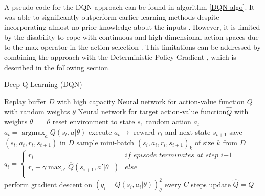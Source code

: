 A pseudo-code for the DQN approach can be found in algorithm \ref{DQN-algo}. It was able to significantly outperform earlier learning methods despite incorporating almost no prior knowledge about the inputs \citep{mnih2013playing}. However, it is limited by the disability to cope with continuous and high-dimensional action spaces due to the max operator in the action selection \citep{lillicrap2015continuous}. This limitations can be addressed by combining the approach with the Deterministic Policy Gradient \citep{silver2014deterministic}, which is described in the following section.

\begin{algorithm}
	\caption{Deep Q-Learning (DQN)}\label{DQN-algo}
	\begin{algorithmic}
		\REQUIRE Replay buffer $\mathit{D}$ with high capacity
		\REQUIRE Neural network for action-value function $\mathit{Q}$
		with random weights $\theta$
		\REQUIRE Neural network for target action-value function$
		\mathit{\hat{Q}}$ with weights $\theta^-=\theta$
		\STATE reset environment to state $s_1$
		\STATE random action $a_t$
		\ELSE
		\STATE $a_t=\operatorname*{argmax}_a Q(s_t,a|\theta)$
		\ENDIF
		\STATE execute $a_t \rightarrow$ reward $r_t$ and next state 
		$s_{t+1}$
		\STATE save $(s_t, a_t, r_t,s_{t+1})$ in $D$
		\STATE sample mini-batch $(s_i, a_i, r_i,s_{i+1})_k$ of size $k$ from $D$
		\STATE $q_i =
			\begin{cases}
			r_i & \textit{if episode terminates at step i+1}\\
			r_i+\gamma \max_{a'}\hat{Q}(s_{i+1}, a'|\theta^{-})& 
			else\\			
			\end{cases}$
		\STATE perform gradient descent on $\left(q_i-Q\left(s_i, 
		a_i|\theta\right)\right)^2_\theta$
		\STATE every $C$ steps update $\hat{Q}=Q$
		\ENDFOR
		\ENDFOR
	\end{algorithmic}
\end{algorithm}


